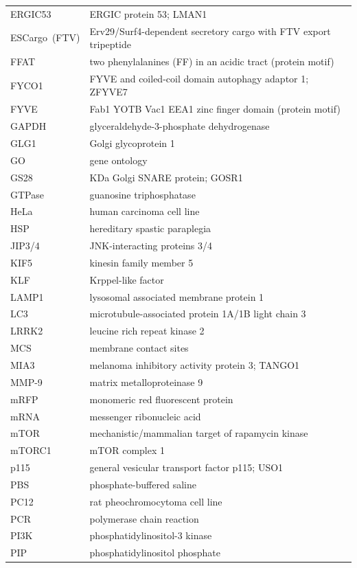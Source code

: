\documentclass[
  12pt,
  a4paper,
]{book}
\begin{document}
\begin{longtable}[]{@{}
  >{\raggedright\arraybackslash}p{}
  >{\raggedright\arraybackslash}p{}@{}}
ERGIC53 & ERGIC protein 53; LMAN1 \\
ESCargo~(FTV) & Erv29/Surf4-dependent secretory cargo with FTV export tripeptide \\
FFAT & two phenylalanines (FF) in an acidic tract (protein motif) \\
FYCO1 & FYVE and coiled-coil domain autophagy adaptor 1; ZFYVE7 \\
FYVE & Fab1 YOTB Vac1 EEA1 zinc finger domain (protein motif) \\
GAPDH & glyceraldehyde-3-phosphate dehydrogenase \\
GLG1 & Golgi glycoprotein 1 \\
GO & gene ontology \\
GS28 & 28 KDa Golgi SNARE protein; GOSR1 \\
GTPase & guanosine triphosphatase \\
HeLa & human carcinoma cell line \\
HSP & hereditary spastic paraplegia \\
JIP3/4 & JNK-interacting proteins 3/4 \\
KIF5 & kinesin family member 5 \\
KLF & Krppel-like factor \\
LAMP1 & lysosomal associated membrane protein 1 \\
LC3 & microtubule-associated protein 1A/1B light chain 3 \\
LRRK2 & leucine rich repeat kinase 2 \\
MCS & membrane contact sites \\
MIA3 & melanoma inhibitory activity protein 3; TANGO1 \\
MMP-9 & matrix metalloproteinase 9 \\
mRFP & monomeric red fluorescent protein \\
mRNA & messenger ribonucleic acid \\
mTOR & mechanistic/mammalian target of rapamycin kinase \\
mTORC1 & mTOR complex 1 \\
p115 & general vesicular transport factor p115; USO1 \\
PBS & phosphate-buffered saline \\
PC12 & rat pheochromocytoma cell line \\
PCR & polymerase chain reaction \\
PI3K & phosphatidylinositol-3 kinase \\
PIP & phosphatidylinositol phosphate \\

\end{longtable}
\end{document}
